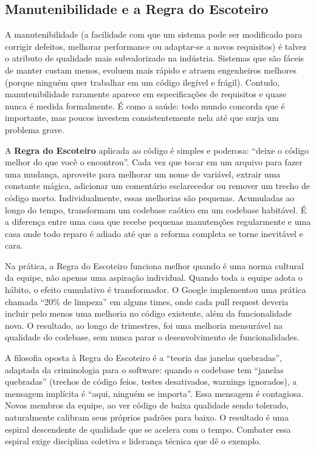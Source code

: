 \subsection{Manutenibilidade e a Regra do Escoteiro}

A manutenibilidade (a facilidade com que um sistema pode ser modificado
para corrigir defeitos, melhorar performance ou adaptar-se a novos
requisitos) é talvez o atributo de qualidade mais subvalorizado na
indústria. Sistemas que são fáceis de manter custam menos, evoluem mais
rápido e atraem engenheiros melhores (porque ninguém quer trabalhar em
um código ilegível e frágil). Contudo, manutenibilidade raramente
aparece em especificações de requisitos e quase nunca é medida
formalmente. É como a saúde: todo mundo concorda que é importante, mas
poucos investem consistentemente nela até que surja um problema grave.

A \textbf{Regra do Escoteiro} aplicada ao código é simples e poderosa:
``deixe o código melhor do que você o encontrou''. Cada vez que tocar em
um arquivo para fazer uma mudança, aproveite para melhorar um nome de
variável, extrair uma constante mágica, adicionar um comentário
esclarecedor ou remover um trecho de código morto. Individualmente, essas
melhorias são pequenas. Acumuladas ao longo do tempo, transformam um
codebase caótico em um codebase habitável. É a diferença entre uma casa
que recebe pequenas manutenções regularmente e uma casa onde todo reparo
é adiado até que a reforma completa se torne inevitável e cara.

Na prática, a Regra do Escoteiro funciona melhor quando é uma norma
cultural da equipe, não apenas uma aspiração individual. Quando toda a
equipe adota o hábito, o efeito cumulativo é transformador. O Google
implementou uma prática chamada ``20\% de limpeza'' em alguns times,
onde cada pull request deveria incluir pelo menos uma melhoria no código
existente, além da funcionalidade nova. O resultado, ao longo de
trimestres, foi uma melhoria mensurável na qualidade do codebase, sem
nunca parar o desenvolvimento de funcionalidades.

A filosofia oposta à Regra do Escoteiro é a ``teoria das janelas
quebradas'', adaptada da criminologia para o software: quando o codebase
tem ``janelas quebradas'' (trechos de código feios, testes desativados,
warnings ignorados), a mensagem implícita é ``aqui, ninguém se
importa''. Essa mensagem é contagiosa. Novos membros da equipe, ao ver
código de baixa qualidade sendo tolerado, naturalmente calibram seus
próprios padrões para baixo. O resultado é uma espiral descendente de
qualidade que se acelera com o tempo. Combater essa espiral exige
disciplina coletiva e liderança técnica que dê o exemplo.

